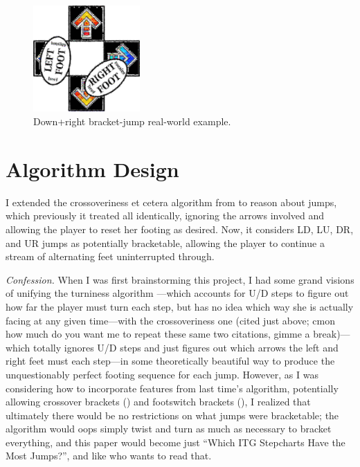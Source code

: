 \documentclass[10pt]{sigplanconf}
\begin{document}
\begin{figure}[h]
	\begin{center}
		\includegraphics[width=0.3625\textwidth]{how-2-bracket.jpg}
	\end{center}
	\caption{Down+right bracket-jump real-world example.}
	\label{fig:how-2-bracket}
\end{figure}


\section{Algorithm Design}
\label{sec:analyzing}

I extended the crossoveriness et cetera algorithm from \cite{crossoveriness} to reason about jumps,
which previously it treated all identically,
ignoring the arrows involved and allowing the player to reset her footing as desired.
Now, it considers LD, LU, DR, and UR jumps as potentially bracketable,
allowing the player to continue a stream of alternating feet uninterrupted through.

\textit{Confession.}
When I was first brainstorming this project,
I had some grand visions of unifying the turniness algorithm \cite{turniness}---which
accounts for U/D steps to figure out how far the player must turn each step,
but has no idea which way she is actually facing at any given time---with
the crossoveriness one
(cited just above; cmon how much do you want me to repeat these same two citations, gimme a break)---which
totally ignores U/D steps and just figures out which arrows the left and right feet must each step---in
some theoretically beautiful way to produce the unquestionably perfect footing sequence for each jump.
%
However, as I was considering how to incorporate features from last time's algorithm,
potentially allowing crossover brackets ()
and footswitch brackets (),
I realized that ultimately there would be no restrictions on what jumps were bracketable;
the algorithm would oops simply twist and turn as much as necessary to bracket everything,
and this paper would become just ``Which ITG Stepcharts Have the Most Jumps?'', and like who wants to read that.
\end{document}
